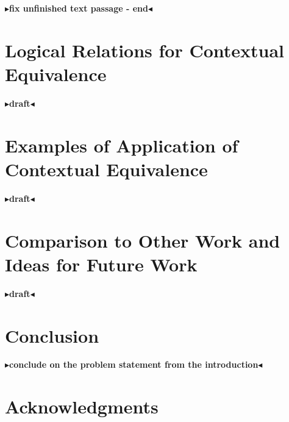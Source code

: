 \documentclass[twoside,11pt,openright]{report}
\newcommand{\todo}[1]{{\color[rgb]{.5,0,0}\textbf{$\blacktriangleright$#1$\blacktriangleleft$}}}
\begin{document}



\todo{fix unfinished text passage - end}



\chapter{Logical Relations for Contextual Equivalence}
\label{ch:LR}

\todo{draft}


\chapter{Examples of Application of Contextual Equivalence}
\label{ch:ACE}

\todo{draft}


\chapter{Comparison to Other Work and Ideas for Future Work}
\label{ch:COWFW}

\todo{draft}


\chapter{Conclusion}
\label{ch:conclusion}

\todo{conclude on the problem statement from the introduction}

\chapter*{Acknowledgments}
\end{document}
